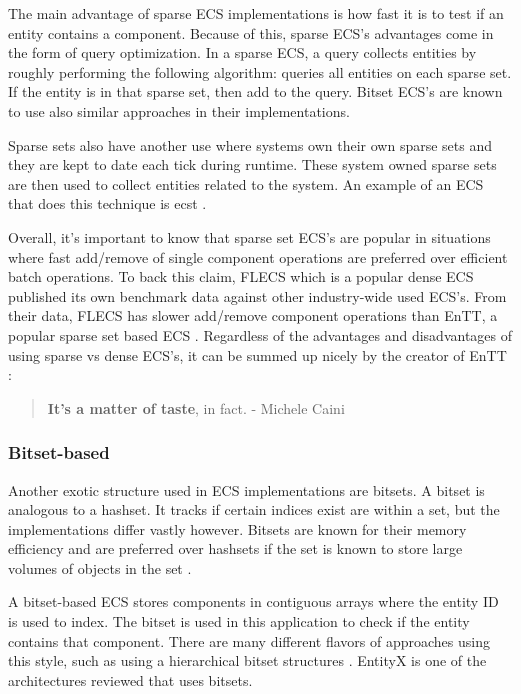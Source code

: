 The main advantage of sparse ECS implementations is how fast it is to test if an entity contains a component. Because of this, sparse ECS's advantages come in the form of query optimization. In a sparse ECS, a query collects entities by roughly performing the following algorithm: queries all entities on each sparse set. If the entity is in that sparse set, then add to the query. Bitset ECS's are known to use also similar approaches in their implementations.\cite{EnTT_SparseSets}

Sparse sets also have another use where systems own their own sparse sets and they are kept to date each tick during runtime. These system owned sparse sets are then used to collect entities related to the system. An example of an ECS that does this technique is ecst \cite{ecst}.

Overall, it's important to know that sparse set ECS's are popular in situations where fast add/remove of single component operations are preferred over efficient batch operations. To back this claim, FLECS which is a popular dense ECS published its own benchmark data against other industry-wide used ECS's. From their data, FLECS has slower add/remove component operations than EnTT, a popular sparse set based ECS \cite{FLECS_EnTTCompare}. Regardless of the advantages and disadvantages of using sparse vs dense ECS's, it can be summed up nicely by the creator of EnTT \cite{EnTT_archetype_and_quote}:

\begin{quote}
    \textbf{It’s a matter of taste}, in fact.
        - Michele Caini
\end{quote}

\subsubsection{Bitset-based}
Another exotic structure used in ECS implementations are bitsets. A bitset is analogous to a hashset. It tracks if certain indices exist are within a set, but the implementations differ vastly however. Bitsets are known for their memory efficiency and are preferred over hashsets if the set is known to store large volumes of objects in the set \cite{Sutherland2014}.

A bitset-based ECS stores components in contiguous arrays where the entity ID is used to index. The bitset is used in this application to check if the entity contains that component. There are many different flavors of approaches using this style, such as using a hierarchical bitset structures \cite{SanderMertensFAQ}. EntityX is one of the architectures reviewed that uses bitsets.

